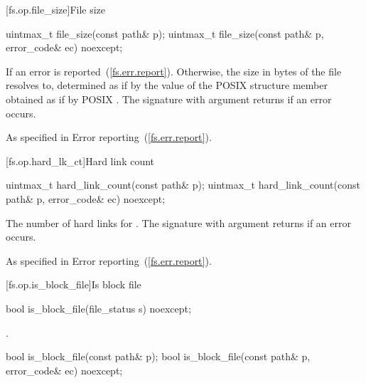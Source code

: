 [fs.op.file_size]{File size}

\begin{itemdecl}
uintmax_t file_size(const path& p);
uintmax_t file_size(const path& p, error_code& ec) noexcept;
\end{itemdecl}

\begin{itemdescr}
\pnum
\returns If 
  an error is reported~(\ref{fs.err.report}). Otherwise, the size in bytes of the file
   resolves to, determined as if by the value of the POSIX 
  structure member  obtained as if by POSIX .
   The signature
  with argument  returns 
  if an error occurs.

\pnum
\throws As specified in Error reporting~(\ref{fs.err.report}).
\end{itemdescr}


[fs.op.hard_lk_ct]{Hard link count}

\begin{itemdecl}
uintmax_t hard_link_count(const path& p);
uintmax_t hard_link_count(const path& p, error_code& ec) noexcept;
\end{itemdecl}

\begin{itemdescr}
\pnum
\returns The number of hard links for . The signature
  with argument  returns 
  if an error occurs.

\pnum
\throws As specified in Error reporting~(\ref{fs.err.report}).
\end{itemdescr}


[fs.op.is_block_file]{Is block file}

\begin{itemdecl}
bool is_block_file(file_status s) noexcept;
\end{itemdecl}

\begin{itemdescr}
\pnum
\returns {}.
\end{itemdescr}

\begin{itemdecl}
bool is_block_file(const path& p);
bool is_block_file(const path& p, error_code& ec) noexcept;
\end{itemdecl}

